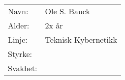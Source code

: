 \begin{table}[H]
\begin{tabular}{l l}
        Navn: & Ole S. Bauck \\
        Alder: & 2x år \\ 
        Linje: & Teknisk Kybernetikk \\
        Styrke: & \\
        Svakhet: & 
    \end{tabular}
\end{table}
